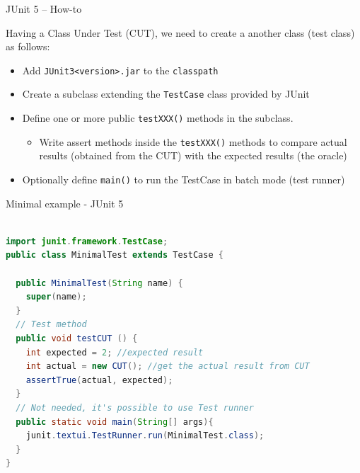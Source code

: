 \documentclass[11pt, xcolor=svgnames]{beamer}
\begin{document}

\begin{frame}{JUnit 5 -- How-to}

Having a Class Under Test (CUT), we need to create a another class (test class) as follows:

\begin{itemize}
 \item Add \texttt{JUnit3<version>.jar} to the \texttt{classpath}
 \item Create a subclass extending the \texttt{TestCase} class provided by JUnit
 \item Define one or more public \texttt{testXXX()} methods in the subclass.
 \begin{itemize}
  \item Write assert methods inside the \texttt{testXXX()} methods to compare actual results (obtained from the CUT) with the expected results (the oracle)
 \end{itemize}
 \item Optionally define \texttt{main()} to run the TestCase in batch mode (test runner)
\end{itemize}


\end{frame}



\begin{frame}[fragile]{Minimal example - JUnit 5}

\begin{center}
\begin{lstlisting}[language=Java,basicstyle=\scriptsize]

import junit.framework.TestCase;
public class MinimalTest extends TestCase {

  public MinimalTest(String name) {
    super(name);
  }
  // Test method
  public void testCUT () {
    int expected = 2; //expected result
    int actual = new CUT(); //get the actual result from CUT
    assertTrue(actual, expected);
  }
  // Not needed, it's possible to use Test runner
  public static void main(String[] args){
    junit.textui.TestRunner.run(MinimalTest.class);
  }
}
\end{lstlisting}
\end{center}

\end{frame}

\end{document}
